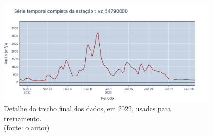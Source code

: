\begin{figure}[!h]
	\centering
	\includegraphics[scale=0.33]{Figuras/jequiti/LR_final_2022_detalhe.png}
	\caption{Detalhe do trecho final dos dados, em 2022, usados para treinamento.\\(fonte: o autor)}
	\label{fig:jequiti_LR_final_2022_detalhe}
\end{figure}


%

